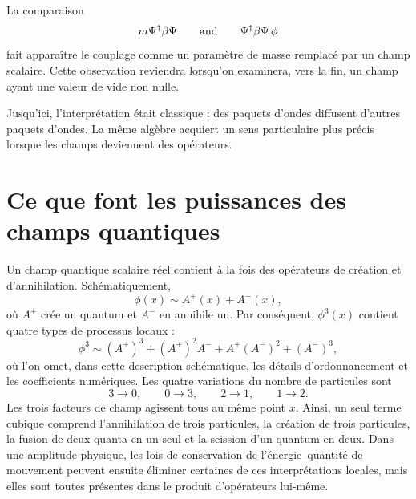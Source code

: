 \begin{classroomqa}
\end{classroomqa}

La comparaison
\begin{equation}
m\Psi^\dagger\beta\Psi
\qquad\hbox{and}\qquad
\Psi^\dagger\beta\Psi\,\phi
\end{equation}
fait apparaître le couplage comme un paramètre de masse remplacé par un champ scalaire. Cette observation reviendra lorsqu’on examinera, vers la fin, un champ ayant une valeur de vide non nulle.

Jusqu’ici, l’interprétation était classique : des paquets d’ondes diffusent d’autres paquets d’ondes. La même algèbre acquiert un sens particulaire plus précis lorsque les champs deviennent des opérateurs.

\section{Ce que font les puissances des champs quantiques}

Un champ quantique scalaire réel contient à la fois des opérateurs de création et d’annihilation. Schématiquement,
\begin{equation}
\phi(x)\sim A^+(x)+A^-(x),
\end{equation}
où \(A^+\) crée un quantum et \(A^-\) en annihile un. Par conséquent, \(\phi^3(x)\) contient quatre types de processus locaux :
\begin{equation}
\phi^3
\sim
(A^+)^3+(A^+)^2A^-+A^+(A^-)^2+(A^-)^3,
\end{equation}
où l’on omet, dans cette description schématique, les détails d’ordonnancement et les coefficients numériques. Les quatre variations du nombre de particules sont
\begin{equation}
3\longrightarrow0,
\qquad
0\longrightarrow3,
\qquad
2\longrightarrow1,
\qquad
1\longrightarrow2.
\end{equation}
Les trois facteurs de champ agissent tous au même point \(x\). Ainsi, un seul terme cubique comprend l’annihilation de trois particules, la création de trois particules, la fusion de deux quanta en un seul et la scission d’un quantum en deux. Dans une amplitude physique, les lois de conservation de l’énergie--quantité de mouvement peuvent ensuite éliminer certaines de ces interprétations locales, mais elles sont toutes présentes dans le produit d’opérateurs lui-même.

